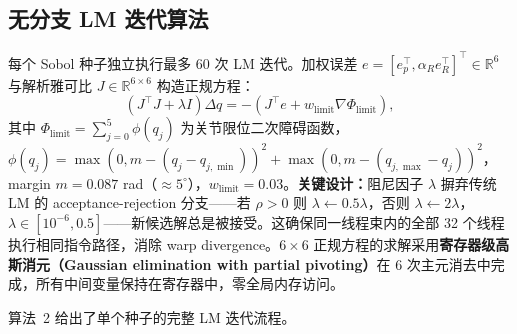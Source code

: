 \documentclass[twocolumn,a4paper,10pt]{ctexart}
\newcommand{\R}{\mathbb{R}}
\begin{document}
\subsection{无分支 LM 迭代算法}

每个 Sobol 种子独立执行最多 60 次 LM 迭代\cite{levenberg1944,marquardt1963}。加权误差 $e=[e_p^\top,\alpha_R e_R^\top]^\top\in\R^6$ 与解析雅可比 $J\in\R^{6\times6}$ 构造正规方程：
\begin{equation}
(J^\top J+\lambda I)\Delta q=-(J^\top e+w_{\mathrm{limit}}\nabla\Phi_{\mathrm{limit}}),
\end{equation}
其中 $\Phi_{\mathrm{limit}}=\sum_{j=0}^5\phi(q_j)$ 为关节限位二次障碍函数，$\phi(q_j)=\max(0,m-(q_j-q_{j,\min}))^2+\max(0,m-(q_{j,\max}-q_j))^2$，margin $m=0.087$ rad（$\approx5^\circ$），$w_{\mathrm{limit}}=0.03$。\textbf{关键设计：}阻尼因子 $\lambda$ 摒弃传统 LM 的 acceptance-rejection 分支——若 $\rho>0$ 则 $\lambda\leftarrow0.5\lambda$，否则 $\lambda\leftarrow2\lambda$，$\lambda\in[10^{-6},0.5]$——新候选解总是被接受。这确保同一线程束内的全部 32 个线程执行相同指令路径，消除 warp divergence。$6\times6$ 正规方程的求解采用\textbf{寄存器级高斯消元（Gaussian elimination with partial pivoting）}在 6 次主元消去中完成，所有中间变量保持在寄存器中，零全局内存访问。

算法~2 给出了单个种子的完整 LM 迭代流程。
\end{document}
